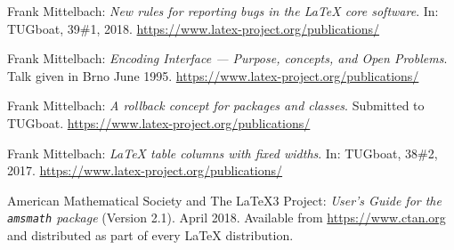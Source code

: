 \documentclass{ltnews}
\begin{document}
\begin{thebibliography}{9}
  
 Frank Mittelbach:
  \emph{New rules for reporting bugs in the \LaTeX{} core software}.  
  In: TUGboat, 39\#1, 2018.
  \url{https://www.latex-project.org/publications/}

 Frank Mittelbach:
  \emph{\LaTeXe{} Encoding Interface --- Purpose, concepts, and 
   Open Problems}.  
  Talk given in Brno June 1995.
  \url{https://www.latex-project.org/publications/}

 Frank Mittelbach:
  \emph{A rollback concept for packages and classes}.  
  Submitted to TUGboat.
  \url{https://www.latex-project.org/publications/}

 Frank Mittelbach:
  \emph{\LaTeX{} table columns with fixed widths}.  
  In: TUGboat, 38\#2, 2017.
  \url{https://www.latex-project.org/publications/}

 American Mathematical Society and The \LaTeX3 Project:
  \emph{User's Guide for the \texttt{amsmath} package} (Version 2.1).  
  April 2018.
  Available from
  \url{https://www.ctan.org}
  and distributed as part of every \LaTeX{} distribution.

\end{thebibliography}
\end{document}
